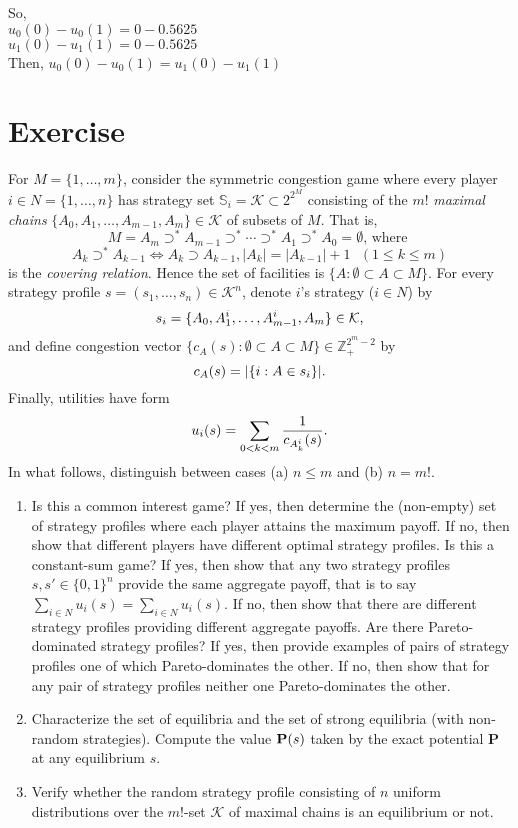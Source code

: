 \documentclass{article}
\begin{document}
So, \\

$u_0(0) - u_0(1) = 0 - 0.5625$ \\
$u_1(0) - u_1(1) = 0 - 0.5625$ \\

Then, $u_0(0) - u_0(1) = u_1(0) - u_1(1)$


\section{Exercise}
For $M=\{1,\ldots,m\}$, consider the symmetric congestion game where every player $i\in N=\{1,\ldots,n\}$ has strategy set $\mathbb S_i=\mathcal K\subset 2^{2^M}$
consisting of the $m!$ \textit{maximal chains} $\{A_0,A_1,\ldots,A_{m-1},A_m\}\in\mathcal K$ of subsets of $M$. That is,
$$M=A_m\supset^*A_{m-1}\supset^*\cdots\supset^*A_1\supset^*A_0=\emptyset\text{, where }$$
$$A_k\supset^*A_{k-1}\Leftrightarrow A_k\supset A_{k-1},|A_k|=|A_{k-1}|+1\text{ }(1\leq k\leq m)$$
is the \textit{covering relation}. Hence the set of facilities is $\{A:\emptyset\subset A\subset M\}$. For every strategy profile $s=(s_1,\ldots,s_n)\in\mathcal K^n$,
denote $i$'s strategy ($i\in N$) by
$$s_i=\{A_0,A_1^i,\ldots,A_{m-1}^i,A_m\}\in\mathcal K\text ,$$
and define congestion vector $\{c_A(s):\emptyset\subset A\subset M\}\in\mathbb Z_+^{2^m-2}$ by
$$c_A(s)=|\{i:A\in s_i\}|\text .$$
Finally, utilities have form
$$u_i(s)=\sum_{0<k<m}\frac{1}{c_{A^i_k}(s)}\text .$$
In what follows, distinguish between cases (a) $n\leq m$ and (b) $n=m!$.
\begin{enumerate}
\item Is this a common interest game? If yes, then determine the (non-empty) set of strategy profiles where each player attains the maximum payoff. If no, then show
that different players have different optimal strategy profiles. Is this a constant-sum game? If yes, then show that any two strategy profiles $s,s'\in\{0,1\}^n$
provide the same aggregate payoff, that is to say $\sum_{i\in N}u_i(s)=\sum_{i\in N}u_i(s)$. If no, then show that there are different strategy profiles providing
different aggregate payoffs. Are there Pareto-dominated strategy profiles? If yes, then provide examples of pairs of strategy profiles one of which Pareto-dominates the
other. If no, then show that for any pair of strategy profiles neither one Pareto-dominates the other.
\item Characterize the set of equilibria and the set of strong equilibria (with non-random strategies). Compute the value $\textbf P(s)$ taken by the exact potential
\textbf P at any equilibrium $s$.
\item Verify whether the random strategy profile consisting of $n$ uniform distributions over the $m!$-set $\mathcal K$ of maximal chains is an equilibrium or not.
\end{enumerate}
\end{document}
